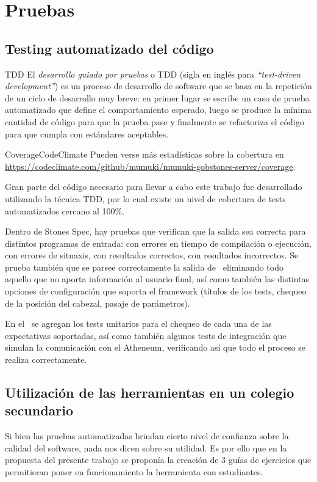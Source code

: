 
\section{Pruebas}
\subsection{Testing automatizado del código}

\sepfootnotecontent
  {TDD}
  {El \emph{desarrollo guiado por pruebas} o TDD (sigla en inglés para \textit{``test-driven development''}) es un proceso de desarrollo de software que se basa en la repetición de un ciclo de desarrollo muy breve: en primer lugar se escribe un caso de prueba automatizado que define el comportamiento esperado, luego se produce la mínima cantidad de código para que la prueba pase y finalmente se refactoriza el código para que cumpla con estándares aceptables.}

\sepfootnotecontent
  {CoverageCodeClimate}
  {Pueden verse más estadísticas sobre la cobertura en \url{https://codeclimate.com/github/mumuki/mumuki-gobstones-server/coverage}.}

Gran parte del código necesario para llevar a cabo este trabajo fue desarrollado utilizando la técnica TDD, por lo cual existe un nivel de cobertura de tests automatizados cercano al 100\%.

Dentro de Stones Spec, hay pruebas que verifican que la salida sea correcta para distintos programas de entrada: con errores en tiempo de compilación o ejecución, con errores de sitnaxis, con resultados correctos, con resultados incorrectos. Se prueba también que se parsee correctamente la salida de \pyGob\ eliminando todo aquello que no aporta información al usuario final, así como también las distintas opciones de configuración que soporta el framework (títulos de los tests, chequeo de la posición del cabezal, pasaje de parámetros).

En el \runner\ se agregan los tests unitarios para el chequeo de cada una de las expectativas soportadas, así como también algunos tests de integración que simulan la comunicación con el Atheneum, verificando así que todo el proceso se realiza correctamente.

\subsection{Utilización de las herramientas en un colegio secundario}
Si bien las pruebas automatizadas brindan cierto nivel de confianza sobre la calidad del software, nada nos dicen sobre su utilidad. Es por ello que en la propuesta del presente trabajo se proponía la creación de 3 guías de ejercicios que permitieran poner en funcionamiento la herramienta con estudiantes.

